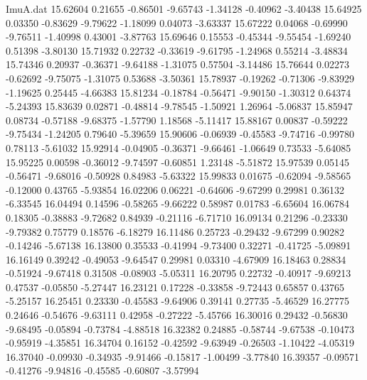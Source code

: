 \begin{filecontents}{ImuA.dat}
  15.62604    0.21655   -0.86501   -9.65743   -1.34128   -0.40962   -3.40438
  15.64925    0.03350   -0.83629   -9.79622   -1.18099    0.04073   -3.63337
  15.67222    0.04068   -0.69990   -9.76511   -1.40998    0.43001   -3.87763
  15.69646    0.15553   -0.45344   -9.55454   -1.69240    0.51398   -3.80130
  15.71932    0.22732   -0.33619   -9.61795   -1.24968    0.55214   -3.48834
  15.74346    0.20937   -0.36371   -9.64188   -1.31075    0.57504   -3.14486
  15.76644    0.02273   -0.62692   -9.75075   -1.31075    0.53688   -3.50361
  15.78937   -0.19262   -0.71306   -9.83929   -1.19625    0.25445   -4.66383
  15.81234   -0.18784   -0.56471   -9.90150   -1.30312    0.64374   -5.24393
  15.83639    0.02871   -0.48814   -9.78545   -1.50921    1.26964   -5.06837
  15.85947    0.08734   -0.57188   -9.68375   -1.57790    1.18568   -5.11417
  15.88167    0.00837   -0.59222   -9.75434   -1.24205    0.79640   -5.39659
  15.90606   -0.06939   -0.45583   -9.74716   -0.99780    0.78113   -5.61032
  15.92914   -0.04905   -0.36371   -9.66461   -1.06649    0.73533   -5.64085
  15.95225    0.00598   -0.36012   -9.74597   -0.60851    1.23148   -5.51872
  15.97539    0.05145   -0.56471   -9.68016   -0.50928    0.84983   -5.63322
  15.99833    0.01675   -0.62094   -9.58565   -0.12000    0.43765   -5.93854
  16.02206    0.06221   -0.64606   -9.67299    0.29981    0.36132   -6.33545
  16.04494    0.14596   -0.58265   -9.66222    0.58987    0.01783   -6.65604
  16.06784    0.18305   -0.38883   -9.72682    0.84939   -0.21116   -6.71710
  16.09134    0.21296   -0.23330   -9.79382    0.75779    0.18576   -6.18279
  16.11486    0.25723   -0.29432   -9.67299    0.90282   -0.14246   -5.67138
  16.13800    0.35533   -0.41994   -9.73400    0.32271   -0.41725   -5.09891
  16.16149    0.39242   -0.49053   -9.64547    0.29981    0.03310   -4.67909
  16.18463    0.28834   -0.51924   -9.67418    0.31508   -0.08903   -5.05311
  16.20795    0.22732   -0.40917   -9.69213    0.47537   -0.05850   -5.27447
  16.23121    0.17228   -0.33858   -9.72443    0.65857    0.43765   -5.25157
  16.25451    0.23330   -0.45583   -9.64906    0.39141    0.27735   -5.46529
  16.27775    0.24646   -0.54676   -9.63111    0.42958   -0.27222   -5.45766
  16.30016    0.29432   -0.56830   -9.68495   -0.05894   -0.73784   -4.88518
  16.32382    0.24885   -0.58744   -9.67538   -0.10473   -0.95919   -4.35851
  16.34704    0.16152   -0.42592   -9.63949   -0.26503   -1.10422   -4.05319
  16.37040   -0.09930   -0.34935   -9.91466   -0.15817   -1.00499   -3.77840
  16.39357   -0.09571   -0.41276   -9.94816   -0.45585   -0.60807   -3.57994

\end{filecontents}
